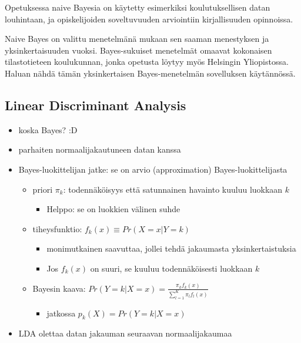 \documentclass[finnish,twoside,openright]{HYgraduMLDS}
\begin{document}
Opetuksessa naive Bayesia on käytetty esimerkiksi koulutuksellisen datan louhintaan\cite{bhardwaj2012data}, ja opiskelijoiden soveltuvuuden arviointiin kirjallisuuden opinnoissa\cite{hellas2018predicting}.

Naive Bayes on valittu menetelmänä mukaan sen saaman menestyksen ja yksinkertaisuuden vuoksi. Bayes-sukuiset menetelmät omaavat kokonaisen tilastotieteen koulukunnan, jonka opetusta löytyy myös Helsingin Yliopistossa. Haluan nähdä tämän yksinkertaisen Bayes-menetelmän sovelluksen käytännössä.


\subsection{Linear Discriminant Analysis}

\begin{itemize}
    \item koska Bayes? :D
    \item parhaiten normaalijakautuneen datan kanssa
    \item Bayes-luokittelijan jatke: se on arvio (approximation) Bayes-luokittelijasta
    \begin{itemize}
        \item priori $\pi_k$: todennäköisyys että satunnainen havainto kuuluu luokkaan $k$
        \begin{itemize}
            \item Helppo: se on luokkien välinen suhde
        \end{itemize}
        \item tiheysfunktio: $f_k(x) \equiv Pr(X = x | Y = k)$
        \begin{itemize}
            \item monimutkainen saavuttaa, jollei tehdä jakaumasta yksinkertaistuksia
        \end{itemize}
        \begin{itemize}
            \item Jos $f_k(x)$ on suuri, se kuuluu todennäköisesti luokkaan $k$
        \end{itemize}
        \item Bayesin kaava: $Pr(Y = k | X = x) = \frac{\pi_k f_k(x)}{\sum^K_{l=1} \pi_l f_l(x)}$
        \begin{itemize}
            \item jatkossa $p_k(X) = Pr(Y = k | X = x)$
        \end{itemize}
    \end{itemize}
    \item LDA olettaa datan jakauman seuraavan normaalijakaumaa

\end{itemize}
\end{document}
